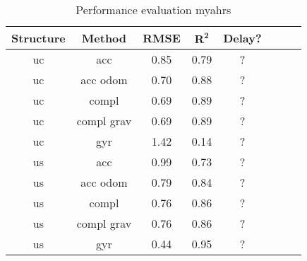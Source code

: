 \begin{table}[htbp]
	\centering
	\caption{Performance evaluation myahrs}
	\label{tab:eval_table}
	\begin{tabular}[t]{cccccccc}
		\toprule
		\textbf{Structure} & \textbf{Method} & \textbf{RMSE} & $\mathbf{R^2}$ & \textbf{Delay?} \\
		\midrule
		uc                 & acc             & 0.85          & 0.79           & ?               \\
		uc                 & acc odom        & 0.70          & 0.88           & ?               \\
		uc                 & compl           & 0.69          & 0.89           & ?               \\
		uc                 & compl grav      & 0.69          & 0.89           & ?               \\
		uc                 & gyr             & 1.42          & 0.14           & ?               \\
		us                 & acc             & 0.99          & 0.73           & ?               \\
		us                 & acc odom        & 0.79          & 0.84           & ?               \\
		us                 & compl           & 0.76          & 0.86           & ?               \\
		us                 & compl grav      & 0.76          & 0.86           & ?               \\
		us                 & gyr             & 0.44          & 0.95           & ?               \\
		\bottomrule
	\end{tabular}
\end{table}

